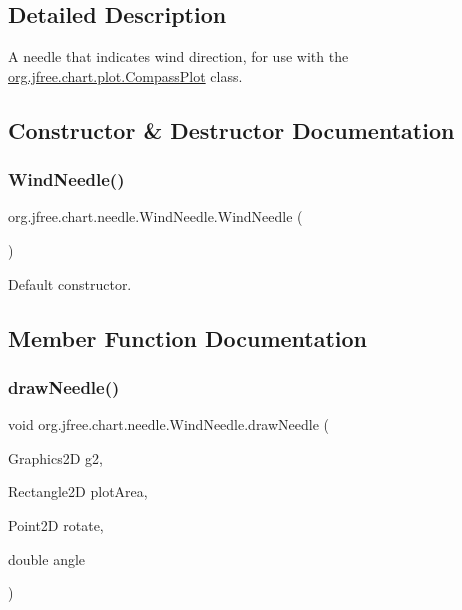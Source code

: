 \subsection{Detailed Description}
A needle that indicates wind direction, for use with the \mbox{\hyperlink{classorg_1_1jfree_1_1chart_1_1plot_1_1_compass_plot}{org.\+jfree.\+chart.\+plot.\+Compass\+Plot}} class. 

\subsection{Constructor \& Destructor Documentation}
\mbox{\label{classorg_1_1jfree_1_1chart_1_1needle_1_1_wind_needle_a04c05956646ec68c2f14ec88cd199935}} 
\subsubsection{\texorpdfstring{Wind\+Needle()}{WindNeedle()}}
{\footnotesize\ttfamily org.\+jfree.\+chart.\+needle.\+Wind\+Needle.\+Wind\+Needle (\begin{DoxyParamCaption}{ }\end{DoxyParamCaption})}

Default constructor. 

\subsection{Member Function Documentation}
\mbox{\label{classorg_1_1jfree_1_1chart_1_1needle_1_1_wind_needle_a774719997f25e69dd042dd48d2f4e8db}} 
\subsubsection{\texorpdfstring{draw\+Needle()}{drawNeedle()}}
{\footnotesize\ttfamily void org.\+jfree.\+chart.\+needle.\+Wind\+Needle.\+draw\+Needle (\begin{DoxyParamCaption}\item[{Graphics2D}]{g2,  }\item[{Rectangle2D}]{plot\+Area,  }\item[{Point2D}]{rotate,  }\item[{double}]{angle }\end{DoxyParamCaption})\hspace{0.3cm}{\ttfamily [protected]}}

